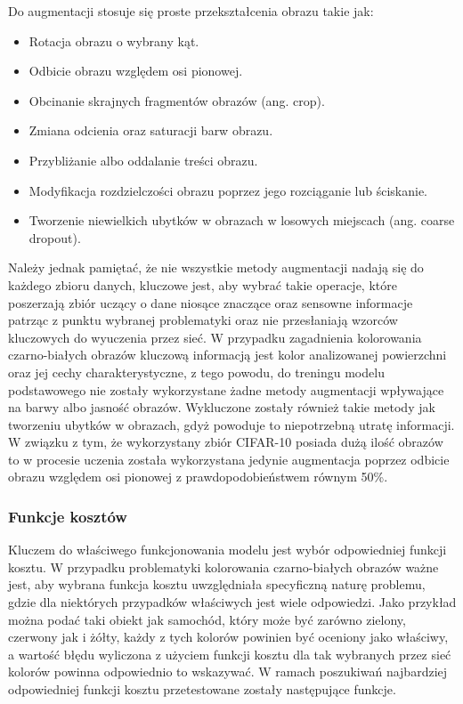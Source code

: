   \noindent
  Do augmentacji stosuje się proste przekształcenia obrazu takie jak:
  \begin{itemize}
  \item Rotacja obrazu o wybrany kąt.
  \item Odbicie obrazu względem osi pionowej.
  \item Obcinanie skrajnych fragmentów obrazów (ang. crop).
  \item Zmiana odcienia oraz saturacji barw obrazu.
  \item Przybliżanie albo oddalanie treści obrazu.
  \item Modyfikacja rozdzielczości obrazu poprzez jego rozciąganie lub ściskanie.
  \item Tworzenie niewielkich ubytków w obrazach w losowych miejscach (ang. coarse dropout).
  \end{itemize}

  Należy jednak pamiętać, że nie wszystkie metody augmentacji nadają się do każdego zbioru
  danych, kluczowe jest, aby wybrać takie operacje, które poszerzają zbiór
  uczący o dane niosące znaczące oraz sensowne informacje patrząc z punktu wybranej
  problematyki oraz nie przesłaniają wzorców kluczowych do wyuczenia przez sieć.
  W przypadku zagadnienia kolorowania czarno-białych obrazów kluczową informacją
  jest kolor analizowanej powierzchni oraz jej cechy charakterystyczne, z tego
  powodu, do treningu modelu podstawowego nie zostały wykorzystane żadne metody
  augmentacji wpływające na barwy albo jasność obrazów. Wykluczone zostały również takie
  metody jak tworzeniu ubytków w obrazach, gdyż powoduje to niepotrzebną utratę
  informacji.
  W związku z tym, że wykorzystany zbiór CIFAR-10 posiada dużą ilość obrazów
  to w procesie uczenia została wykorzystana jedynie augmentacja poprzez
  odbicie obrazu względem osi pionowej z prawdopodobieństwem równym 50\%.


\subsubsection{Funkcje kosztów} \label{Funkcje kosztów}
  Kluczem do właściwego funkcjonowania modelu jest wybór odpowiedniej funkcji
  kosztu. W przypadku problematyki kolorowania czarno-białych obrazów ważne
  jest, aby wybrana funkcja kosztu uwzględniała specyficzną naturę problemu,
  gdzie dla niektórych przypadków właściwych jest wiele odpowiedzi. Jako
  przykład można podać taki obiekt jak samochód, który może być zarówno
  zielony, czerwony jak i żółty, każdy z tych kolorów powinien być oceniony
  jako właściwy, a wartość błędu wyliczona z użyciem funkcji kosztu dla tak
  wybranych przez sieć kolorów powinna odpowiednio to wskazywać. W ramach
  poszukiwań najbardziej odpowiedniej funkcji kosztu przetestowane zostały
  następujące funkcje.

